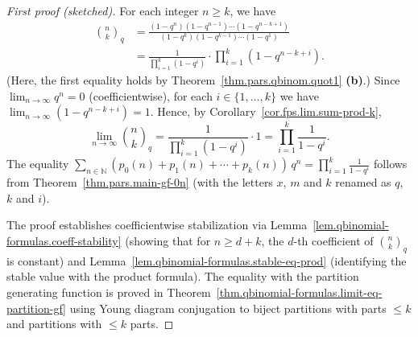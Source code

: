 \begin{proof}[First proof (sketched)]
\leanok
For each integer $n\geq k$, we have
\begin{align*}
\binom{n}{k}_{q}  &  =\frac{\left(  1-q^{n}\right)  \left(  1-q^{n-1}%
\right)  \cdots\left(  1-q^{n-k+1}\right)  }{\left(  1-q^{k}\right)  \left(
1-q^{k-1}\right)  \cdots\left(  1-q^{1}\right)  }
\\
&  =\frac{1}{\prod_{i=1}^{k}\left(  1-q^{i}\right)  }\cdot
\prod_{i=1}^{k}\left(  1-q^{n-k+i}\right)  .
\end{align*}
(Here, the first equality holds by Theorem~\ref{thm.pars.qbinom.quot1} \textbf{(b)}.)
Since $\lim_{n\to\infty} q^n = 0$ (coefficientwise),
for each $i \in \{1,\ldots,k\}$ we have
$\lim_{n\to\infty}(1-q^{n-k+i}) = 1$.
Hence, by Corollary~\ref{cor.fps.lim.sum-prod-k},
\[
\lim_{n\to\infty}\binom{n}{k}_q
= \frac{1}{\prod_{i=1}^k(1-q^i)} \cdot 1
= \prod_{i=1}^k \frac{1}{1-q^i}.
\]
The equality
$\sum_{n\in\mathbb{N}}(p_0(n)+p_1(n)+\cdots+p_k(n))\,q^n = \prod_{i=1}^k \frac{1}{1-q^i}$
follows from Theorem~\ref{thm.pars.main-gf-0n}
(with the letters $x$, $m$ and $k$ renamed as $q$, $k$ and $i$).

The proof establishes coefficientwise stabilization via
Lemma~\ref{lem.qbinomial-formulas.coeff-stability} (showing that for $n \ge d + k$, the $d$-th coefficient
of $\binom{n}{k}_q$ is constant) and Lemma~\ref{lem.qbinomial-formulas.stable-eq-prod}
(identifying the stable value with the product formula).
The equality with the partition generating function is proved in
Theorem~\ref{thm.qbinomial-formulas.limit-eq-partition-gf} using Young diagram conjugation
to biject partitions with parts $\le k$ and partitions with $\le k$ parts.
\end{proof}
